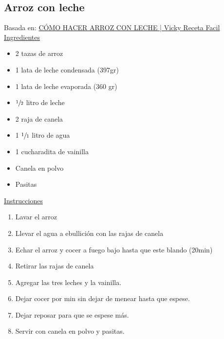 \subsection{Arroz con leche}

Basada en: \href{https://www.youtube.com/watch?v=tJkeaqp3ULg}{CÓMO HACER ARROZ CON LECHE | Vicky Receta Facil} \\

\underline{Ingredientes}

\begin{itemize}
\item 2 tazas de arroz
\item 1 lata de leche condensada (397gr)
\item 1 lata de leche evaporada (360 gr)
\item $\sfrac{1}{2}$ litro de leche
\item 2 raja de canela
\item 1 $\sfrac{1}{1}$ litro de agua
\item 1 cucharadita de vainilla
\item Canela en polvo
\item Pasitas
\end{itemize}


\underline{Instrucciones}

\begin{enumerate}
\item Lavar el arroz
\item Llevar el agua a ebullición con las rajas de canela
\item Echar el arroz y cocer a fuego bajo hasta que este blando (\Sim 20min)
\item Retirar las rajas de canela
\item Agregar las tres leches  y la vainilla.
\item Dejar cocer por  min sin dejar de menear hasta que espese.
\item Dejar reposar para que se espese más.
\item Servir con canela en polvo y pasitas.
\end{enumerate}

